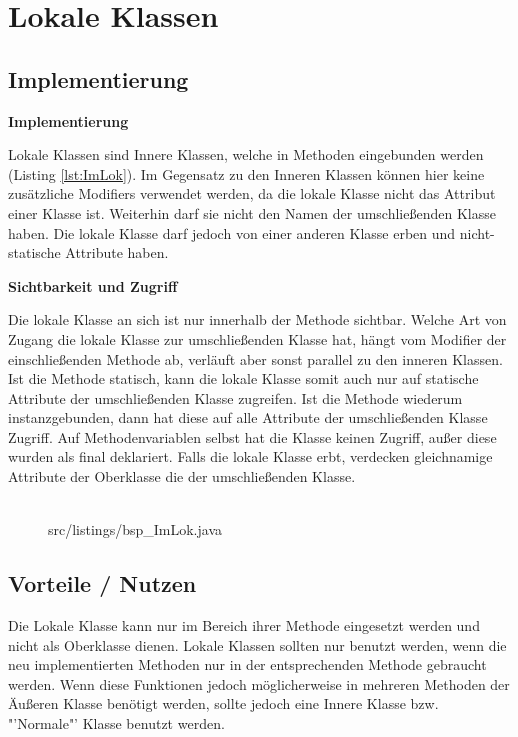 \section{Lokale Klassen}
\subsection {Implementierung}

{\bf Implementierung}

Lokale Klassen sind Innere Klassen, welche in Methoden eingebunden werden (Listing \ref{lst:ImLok}).
Im Gegensatz zu den Inneren Klassen können hier keine zusätzliche Modifiers verwendet werden, da die lokale Klasse nicht das Attribut einer Klasse ist.
Weiterhin darf sie nicht den Namen der umschließenden Klasse haben.
Die lokale Klasse darf jedoch von einer anderen Klasse erben und nicht-statische Attribute haben.

{\bf Sichtbarkeit und Zugriff}

Die lokale Klasse an sich ist nur innerhalb der Methode sichtbar. Welche Art von Zugang die lokale Klasse zur umschließenden Klasse hat, hängt vom Modifier der einschließenden Methode ab, verläuft aber sonst parallel zu den inneren Klassen.
Ist die Methode statisch, kann die lokale Klasse somit auch nur auf statische Attribute der umschließenden Klasse zugreifen. Ist die Methode wiederum instanzgebunden, dann hat diese auf alle Attribute der umschließenden Klasse Zugriff.
Auf Methodenvariablen selbst hat die Klasse keinen Zugriff, außer diese wurden als final deklariert. Falls die lokale Klasse erbt, verdecken gleichnamige Attribute der Oberklasse die der umschließenden Klasse.
\\
\\
\begin{figure}[H]
\lstset{language=Java}
 {src/listings/bsp_ImLok.java}
\end{figure}

\subsection{Vorteile / Nutzen}

Die Lokale Klasse kann nur im Bereich ihrer Methode eingesetzt werden und nicht als Oberklasse dienen.
Lokale Klassen sollten nur benutzt werden, wenn die neu implementierten Methoden nur in der entsprechenden Methode gebraucht werden.
Wenn diese Funktionen jedoch möglicherweise in mehreren Methoden der Äußeren Klasse benötigt werden, sollte jedoch eine Innere Klasse bzw. "'Normale"' Klasse benutzt werden.



